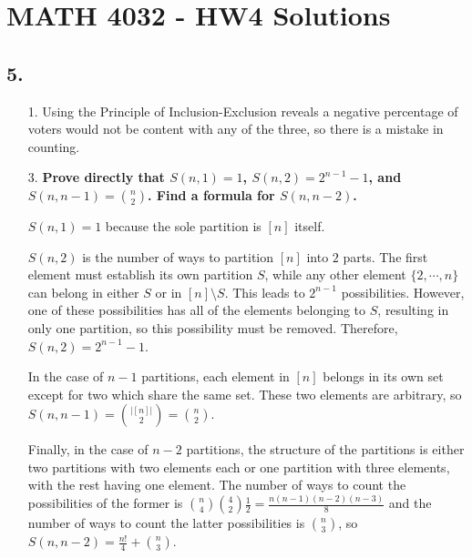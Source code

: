 \documentclass[a4paper,12pt]{article}
\begin{document}
\section*{MATH 4032 - HW4 Solutions}
\subsection*{5.}
\begin{enumerate}
    \item[1.]
        Using the Principle of Inclusion-Exclusion reveals a negative percentage of voters would not be content with any of the three, so there is a mistake in counting.

    \item[3.]
        \boldmath
        \textbf{Prove directly that $S(n, 1) = 1$, $S(n, 2) = 2^{n - 1} - 1$, and $S(n, n - 1) = \binom{n}{2}$. Find a formula for $S(n, n - 2)$.} \par
        \unboldmath
        $S(n, 1) = 1$ because the sole partition is $[n]$ itself. \par
        $S(n, 2)$ is the number of ways to partition $[n]$ into $2$ parts. The first element must establish its own partition $S$, while any other element $\{ 2, \cdots, n \}$ can belong in either $S$ or in $[n] \setminus S$. This leads to $2^{n - 1}$ possibilities. However, one of these possibilities has all of the elements belonging to $S$, resulting in only one partition, so this possibility must be removed. Therefore, $S(n, 2) = 2^{n - 1} - 1$. \par
        In the case of $n - 1$ partitions, each element in $[n]$ belongs in its own set except for two which share the same set. These two elements are arbitrary, so $S(n, n - 1) = \binom{|[n]|}{2} = \binom{n}{2}$. \par
        Finally, in the case of $n - 2$ partitions, the structure of the partitions is either two partitions with two elements each or one partition with three elements, with the rest having one element. The number of ways to count the possibilities of the former is $\binom{n}{4} \binom{4}{2} \frac{1}{2} = \frac{n(n - 1)(n - 2)(n - 3)}{8}$ and the number of ways to count the latter possibilities is $\binom{n}{3}$, so $S(n, n - 2) = \frac{n!}{4} + \binom{n}{3}$.


\end{enumerate}
\end{document}
